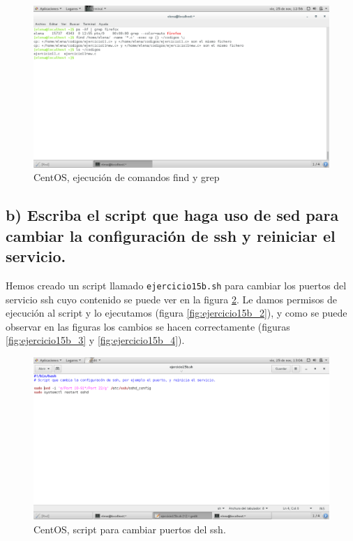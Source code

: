 \begin{figure}[H] 
	\centering
	\includegraphics[width=15cm]{./img/ejercicio15a.png} 	
	\caption{CentOS, ejecución de comandos find y grep} \label{fig:ejercicio15a}
\end{figure}


\subsection{b) Escriba el script que haga uso de sed para cambiar la configuración de ssh y reiniciar el servicio. }
Hemos creado un script llamado \texttt{ejercicio15b.sh} para cambiar los puertos del servicio ssh cuyo contenido se puede ver en la figura \ref{fig:ejercicio15b_1}. Le damos permisos de ejecución al script y lo ejecutamos (figura \ref{fig:ejercicio15b_2}), y como se puede observar en las figuras los cambios se hacen correctamente (figuras \ref{fig:ejercicio15b_3} y \ref{fig:ejercicio15b_4}).


\begin{figure}[H] 
	\centering
	\includegraphics[width=15cm]{./img/ejercicio15b_1.png} 	
	\caption{CentOS, script para cambiar puertos del ssh.} \label{fig:ejercicio15b_1}
\end{figure}

